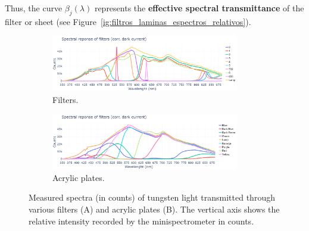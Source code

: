 \noindent Thus, the curve \(\beta_j(\lambda)\) represents the \textbf{effective spectral transmittance} of the filter or sheet (see Figure~\ref{ig:filtros_laminas_espectros_relativos}).

\begin{figure}[H]
    \centering
    \begin{subfigure}{\textwidth}
        \centering
        \includegraphics[trim=0mm 0mm 0mm 25mm, clip, width=0.9\textwidth]{Figures/C3/filtros_spec.png}
        \caption{Filters.}
        \label{fig:filtros_espectros}
    \end{subfigure}
    \vspace{1em}
    \begin{subfigure}{\textwidth}
        \centering
        \includegraphics[trim=0mm 0mm 0mm 25mm, clip, width=0.9\textwidth]{Figures/C3/laminas_spec.png}
        \caption{Acrylic plates.}
        \label{fig:laminas_espectros}
    \end{subfigure}
    \caption{Measured spectra (in counts) of tungsten light transmitted through various filters (A) and acrylic plates (B). The vertical axis shows the relative intensity recorded by the minispectrometer in counts.}
    \label{fig:espectros_combinados}
\end{figure}

